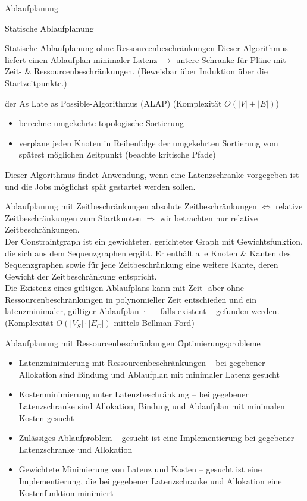 \begin{chapter}{Ablaufplanung}
\begin{section}{Statische Ablaufplanung}
\begin{subsection}{Statische Ablaufplanung ohne Ressourcenbeschränkungen}
   Dieser Algorithmus liefert einen Ablaufplan minimaler Latenz $\rightarrow$ untere Schranke für Pläne mit Zeit- \& Ressourcenbeschränkungen. (Beweisbar über Induktion über die Startzeitpunkte.) 
   
   \f{der As Late as Possible-Algorithmus (ALAP) (Komplexität $O(|V| + |E|)$)}
   \begin{itemize}
    \item berechne umgekehrte topologische Sortierung
    \item verplane jeden Knoten in Reihenfolge der umgekehrten Sortierung vom spätest möglichen Zeitpunkt (beachte kritische Pfade)
   \end{itemize}

   Dieser Algorithmus findet Anwendung, wenn eine Latenzschranke vorgegeben ist und die Jobs möglichst spät gestartet werden sollen.
   \end{subsection}
   
   \begin{subsection}{Ablaufplanung mit Zeitbeschränkungen}
    absolute Zeitbeschränkungen $\Leftrightarrow$ relative Zeitbeschränkungen zum Startknoten $\Rightarrow$ wir betrachten nur relative Zeitbeschränkungen.\\
    
    Der \f{Constraintgraph} ist ein gewichteter, gerichteter Graph mit Gewichtsfunktion, die sich aus dem Sequenzgraphen ergibt. Er enthält alle Knoten \& Kanten des Sequenzgraphen sowie für jede Zeitbeschränkung eine weitere Kante, deren Gewicht der Zeitbeschränkung entspricht.\\
    
    Die Existenz eines gültigen Ablaufplans kann mit Zeit- aber ohne Ressourcenbeschränkungen in polynomieller Zeit entschieden und ein latenzminimaler, gültiger Ablaufplan $\uptau$ -- falls existent -- gefunden werden. (Komplexität $O(|V_S|\cdot|E_C|)$ mittels Bellman-Ford)\\
   \end{subsection}
   
   \begin{subsection}{Ablaufplanung mit Ressourcenbeschränkungen}
    \f{Optimierungsprobleme}
    \begin{itemize}
     \item Latenzminimierung mit Ressourcenbeschränkungen -- bei gegebener Allokation sind Bindung und Ablaufplan mit minimaler Latenz gesucht
     \item Kostenminimierung unter Latenzbeschränkung -- bei gegebener Latenzschranke sind Allokation, Bindung und Ablaufplan mit minimalen Kosten gesucht
     \item Zulässiges Ablaufproblem -- gesucht ist eine Implementierung bei gegebener Latenzschranke und Allokation
     \item Gewichtete Minimierung von Latenz und Kosten -- gesucht ist eine Implementierung, die bei gegebener Latenzschranke und Allokation eine Kostenfunktion minimiert
    \end{itemize}
    

\end{subsection}
\end{section}
\end{chapter}
